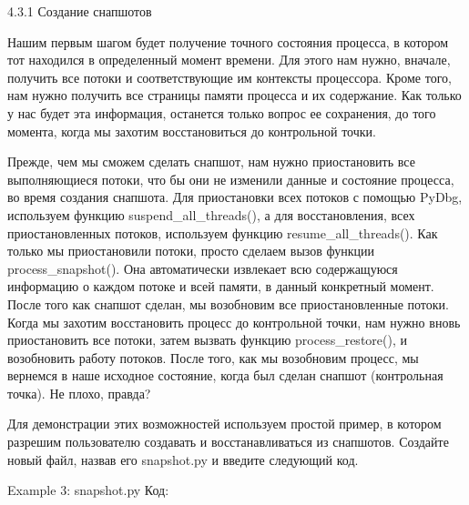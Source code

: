 \documentclass[12pt, a4paper, oneside]{book}
\begin{document}
4.3.1 Создание снапшотов

Нашим первым шагом будет получение точного состояния процесса, в котором тот находился в определенный момент времени. Для этого нам нужно, вначале, получить все потоки и соответствующие им контексты процессора. Кроме того, нам нужно получить все страницы памяти процесса и их содержание. Как только у нас будет эта информация, останется только вопрос ее сохранения, до того момента, когда мы захотим восстановиться до контрольной точки. 

Прежде, чем мы сможем сделать снапшот, нам нужно приостановить все выполняющиеся потоки, что бы они не изменили данные и состояние процесса, во время создания снапшота. Для приостановки всех потоков с помощью PyDbg, используем функцию suspend\_all\_threads(), а для восстановления, всех приостановленных потоков, используем функцию resume\_all\_threads(). Как только мы приостановили потоки, просто сделаем вызов функции process\_snapshot(). Она автоматически извлекает всю содержащуюся информацию о каждом потоке и всей памяти, в данный конкретный момент. После того как снапшот сделан, мы возобновим все приостановленные потоки. Когда мы захотим восстановить процесс до контрольной точки, нам нужно вновь приостановить все потоки, затем вызвать функцию process\_restore(), и возобновить работу потоков. После того, как мы возобновим процесс, мы вернемся в наше исходное состояние, когда был сделан снапшот (контрольная точка). Не плохо, правда?

Для демонстрации этих возможностей используем простой пример, в котором разрешим пользователю создавать и восстанавливаться из снапшотов. Создайте новый файл, назвав его snapshot.py и введите следующий код.

Example 3: snapshot.py
Код:


    

\end{document}
